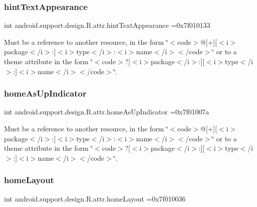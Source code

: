 \subsubsection{\texorpdfstring{hint\+Text\+Appearance}{hintTextAppearance}}
{\footnotesize\ttfamily int android.\+support.\+design.\+R.\+attr.\+hint\+Text\+Appearance =0x7f010133\hspace{0.3cm}{\ttfamily [static]}}

Must be a reference to another resource, in the form \char`\"{}$<$code$>$@\mbox{[}+\mbox{]}\mbox{[}$<$i$>$package$<$/i$>$\+:\mbox{]}$<$i$>$type$<$/i$>$\+:$<$i$>$name$<$/i$>$$<$/code$>$\char`\"{} or to a theme attribute in the form \char`\"{}$<$code$>$?\mbox{[}$<$i$>$package$<$/i$>$\+:\mbox{]}\mbox{[}$<$i$>$type$<$/i$>$\+:\mbox{]}$<$i$>$name$<$/i$>$$<$/code$>$\char`\"{}. \mbox{\label{classandroid_1_1support_1_1design_1_1R_1_1attr_acd12fadab5fd0cefc308b364fc46c135}} 
\subsubsection{\texorpdfstring{home\+As\+Up\+Indicator}{homeAsUpIndicator}}
{\footnotesize\ttfamily int android.\+support.\+design.\+R.\+attr.\+home\+As\+Up\+Indicator =0x7f01007a\hspace{0.3cm}{\ttfamily [static]}}

Must be a reference to another resource, in the form \char`\"{}$<$code$>$@\mbox{[}+\mbox{]}\mbox{[}$<$i$>$package$<$/i$>$\+:\mbox{]}$<$i$>$type$<$/i$>$\+:$<$i$>$name$<$/i$>$$<$/code$>$\char`\"{} or to a theme attribute in the form \char`\"{}$<$code$>$?\mbox{[}$<$i$>$package$<$/i$>$\+:\mbox{]}\mbox{[}$<$i$>$type$<$/i$>$\+:\mbox{]}$<$i$>$name$<$/i$>$$<$/code$>$\char`\"{}. \mbox{\label{classandroid_1_1support_1_1design_1_1R_1_1attr_a4e4911b093d74cb70c4440363410110e}} 
\subsubsection{\texorpdfstring{home\+Layout}{homeLayout}}
{\footnotesize\ttfamily int android.\+support.\+design.\+R.\+attr.\+home\+Layout =0x7f010036\hspace{0.3cm}{\ttfamily [static]}}


